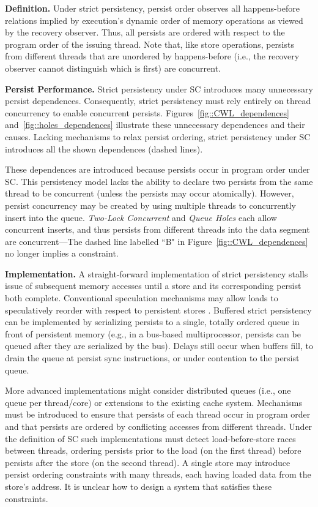 \textbf{Definition.}
Under strict persistency, persist order observes all happens-before relations implied by execution's dynamic order of memory operations as viewed by the recovery observer.
Thus, all persists are ordered with respect to the program order of the issuing thread.
Note that, like store operations, persists from different threads that are unordered by happens-before (i.e., the recovery observer cannot distinguish which is first) are concurrent.

\textbf{Persist Performance.}
Strict persistency under SC introduces many unnecessary persist dependences.
Consequently, strict persistency must rely entirely on thread concurrency to enable concurrent persists.
Figures~\ref{fig::CWL_dependences} and~\ref{fig::holes_dependences} illustrate these unnecessary dependences and their causes.
Lacking mechanisms to relax persist ordering, strict persistency under SC introduces all the shown dependences (dashed lines).

These dependences are introduced because persists occur in program order under SC.
This persistency model lacks the ability to declare two persists from the same thread to be concurrent (unless the persists may occur atomically).
However, persist concurrency may be created by using multiple threads to concurrently insert into the queue.
\emph{Two-Lock Concurrent} and \emph{Queue Holes} each allow concurrent inserts, and thus persists from different threads into the data segment are concurrent---The dashed line labelled ``B" in Figure~\ref{fig::CWL_dependences} no longer implies a constraint.

\textbf{Implementation.}
A straight-forward implementation of strict persistency stalls issue of subsequent memory accesses until a store and its corresponding persist both complete.
Conventional speculation mechanisms may allow loads to speculatively reorder with respect to persistent stores \cite{Gharachorloo91}.
Buffered strict persistency can be implemented by serializing persists to a single, totally ordered queue in front of persistent memory (e.g., in a bus-based multiprocessor, persists can be queued after they are serialized by the bus).
Delays still occur when buffers fill, to drain the queue at persist sync instructions, or under contention to the persist queue.

More advanced implementations might consider distributed queues (i.e., one queue per thread/core) or extensions to the existing cache system.
Mechanisms must be introduced to ensure that persists of each thread occur in program order and that persists are ordered by conflicting accesses from different threads.
Under the definition of SC such implementations must detect load-before-store races between threads, ordering persists prior to the load (on the first thread) before persists after the store (on the second thread).
A single store may introduce persist ordering constraints with many threads, each having loaded data from the store's address.
It is unclear how to design a system that satisfies these constraints.

